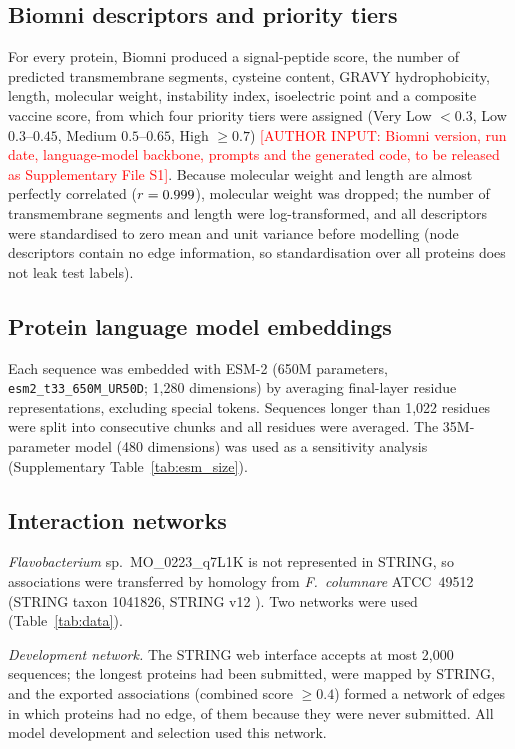 \documentclass[pdflatex,sn-mathphys-num]{sn-jnl}
\newcommand{\authorinput}[1]{\textcolor{red}{[AUTHOR INPUT: #1]}}
\begin{document}
\subsection{Biomni descriptors and priority tiers}
For every protein, Biomni \cite{huang2025biomni} produced a signal-peptide score, the number of predicted transmembrane segments, cysteine content, GRAVY hydrophobicity, length, molecular weight, instability index, isoelectric point and a composite vaccine score, from which four priority tiers were assigned (Very Low $<0.3$, Low $0.3$--$0.45$, Medium $0.5$--$0.65$, High $\geq0.7$) \authorinput{Biomni version, run date, language-model backbone, prompts and the generated code, to be released as Supplementary File S1}. Because molecular weight and length are almost perfectly correlated ($r=0.999$), molecular weight was dropped; the number of transmembrane segments and length were log-transformed, and all descriptors were standardised to zero mean and unit variance before modelling (node descriptors contain no edge information, so standardisation over all proteins does not leak test labels).

\subsection{Protein language model embeddings}
Each sequence was embedded with ESM-2 \cite{lin2023esm2} (650M parameters, \texttt{esm2\_t33\_650M\_UR50D}; 1,280 dimensions) by averaging final-layer residue representations, excluding special tokens. Sequences longer than 1,022 residues were split into consecutive chunks and all residues were averaged. The 35M-parameter model (480 dimensions) was used as a sensitivity analysis (Supplementary Table~\ref{tab:esm_size}).

\subsection{Interaction networks}\label{sec:networks}
\textit{Flavobacterium} sp.\ MO\_0223\_q7L1K is not represented in STRING, so associations were transferred by homology from \textit{F.\ columnare} ATCC~49512 (STRING taxon 1041826, STRING v12 \cite{szklarczyk2023string}). Two networks were used (Table~\ref{tab:data}).

\emph{Development network.} The STRING web interface accepts at most 2,000 sequences; the \nSubmitted{} longest proteins had been submitted, \nWebMapped{} were mapped by STRING, and the exported associations (combined score $\geq0.4$) formed a network of \nEdgesDev{} edges in which \nIsoDev{} proteins had no edge, \nNeverSubmitted{} of them because they were never submitted. All model development and selection used this network.
\end{document}
